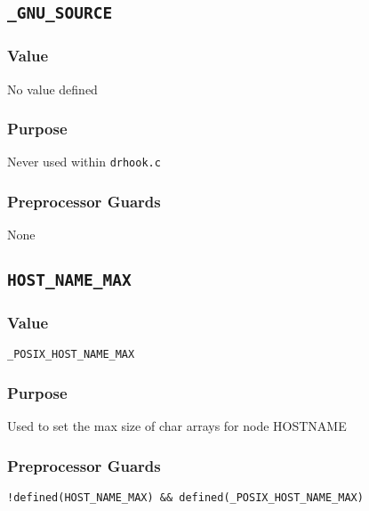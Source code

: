 
\subsection{\texttt{\_GNU\_SOURCE}}
\vspace{-2ex}
\subsubsection{Value}
\vspace{-2ex}
No value defined

\vspace{-2ex}
\subsubsection{Purpose}
\vspace{-2ex}
 Never used within \texttt{drhook.c}

\vspace{-2ex}
\subsubsection{Preprocessor Guards}
\vspace{-2ex}
None


\subsection{\texttt{HOST\_NAME\_MAX}}
\vspace{-2ex}
\subsubsection{Value}
\vspace{-2ex}
\verb|_POSIX_HOST_NAME_MAX|

\vspace{-2ex}
\subsubsection{Purpose}
\vspace{-2ex}
Used to set the max size of char arrays for node HOSTNAME

\vspace{-2ex}
\subsubsection{Preprocessor Guards}
\vspace{-2ex}
\verb|!defined(HOST_NAME_MAX) && defined(_POSIX_HOST_NAME_MAX)|

